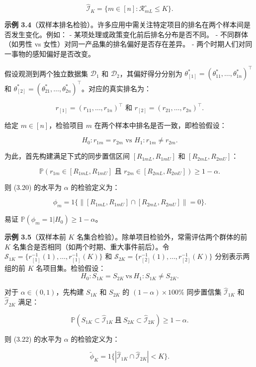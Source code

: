 $$
\widehat{\mathcal{I}}_K = \{m\in [n]:\mathcal{R}_{mL}^{\circ}\leq K\} .
$$

\textbf{示例 3.4}（双样本排名检验）。许多应用中需关注特定项目的排名在两个样本间是否发生变化。例如：
- 某项处理或政策变化前后排名分布是否不同。
- 不同群体（如男性 vs 女性）对同一产品集的排名偏好是否存在差异。
- 两个时期人们对同一事物的感知偏好是否改变。

假设观测到两个独立数据集 $\mathcal{D}_1$ 和 $\mathcal{D}_2$，其偏好得分分别为 $\theta_{[1]}^{*} = (\theta_{11}^{*},\ldots ,\theta_{1n}^{*})^{\top}$ 和 $\theta_{[2]}^{*} = (\theta_{21}^{*},\ldots ,\theta_{2n}^{*})^{\top}$。对应的真实排名为：

$$
r_{[1]} = (r_{11},\ldots ,r_{1n})^{\top} \text{ 和 } r_{[2]} = (r_{21},\ldots ,r_{2n})^{\top}.
$$

给定 $m\in [n]$，检验项目 $m$ 在两个样本中排名是否一致，即检验假设：

\[
H_{0}:r_{1m} = r_{2m} \text{ vs } H_{1}:r_{1m}\neq r_{2m}. \tag{3.20}
\]

为此，首先构建满足下式的同步置信区间 $[R_{1mL},R_{1mU}]$ 和 $[R_{2mL},R_{2mU}]$：

\[
\mathbb{P}(r_{1m}\in [R_{1mL},R_{1mU}]\text{ 且 } r_{2m}\in [R_{2mL},R_{2mU}])\geq 1 - \alpha . \tag{3.21}
\]

则 (3.20) 的水平为 $\alpha$ 的检验定义为：

$$
\phi_{m} = 1\{\|[R_{1mL},R_{1mU}]\cap [R_{2mL},R_{2mU}]\| = 0\} .
$$

易证 $\mathbb{P}(\phi_{m} = 1|H_{0})\geq 1 - \alpha$。

\textbf{示例 3.5}（双样本前 $K$ 名集合检验）。除单项目检验外，常需评估两个群体的前 $K$ 名集合是否相同（如两个时期、重大事件前后）。令 $\mathcal{S}_{1K} = \{r_{[1]}^{- 1}(1),\ldots ,r_{[1]}^{- 1}(K)\}$ 和 $\mathcal{S}_{2K} = \{r_{[2]}^{- 1}(1),\ldots ,r_{[2]}^{- 1}(K)\}$ 分别表示两组的前 $K$ 名项目集。检验假设：
\[
H_{0}:S_{1K} = S_{2K}\mathrm{~vs~}H_{1}:S_{1K}\neq S_{2K}. \tag{3.22}
\]

对于 $\alpha \in (0,1)$，先构建 $S_{1K}$ 和 $S_{2K}$ 的 $(1 - \alpha)\times 100\%$ 同步置信集 $\widehat{\mathcal{I}}_{1K}$ 和 $\widehat{\mathcal{I}}_{2K}$ 满足：

\[
\mathbb{P}\left(S_{1K}\subset \widehat{\mathcal{I}}_{1K}\mathrm{~且~}S_{2K}\subset \widehat{\mathcal{I}}_{2K}\right)\geq 1 - \alpha . \tag{3.23}
\]

则 (3.22) 的水平为 $\alpha$ 的检验定义为：

$$
\widetilde{\phi}_{K} = 1\{|\widehat{\mathcal{I}}_{1K}\cap \widehat{\mathcal{I}}_{2K}|< K\} .
$$

